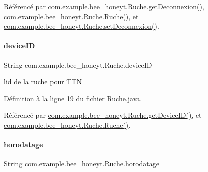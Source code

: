 Référencé par \hyperlink{_ruche_8java_source_l00115}{com.\+example.\+bee\+\_\+honeyt.\+Ruche.\+get\+Deconnexion()}, \hyperlink{_ruche_8java_source_l00044}{com.\+example.\+bee\+\_\+honeyt.\+Ruche.\+Ruche()}, et \hyperlink{_ruche_8java_source_l00117}{com.\+example.\+bee\+\_\+honeyt.\+Ruche.\+set\+Deconnexion()}.

\mbox{\label{classcom_1_1example_1_1bee__honeyt_1_1_ruche_a7126c2ff9e0b3b5365e042c5309ad775}} 
\paragraph{\texorpdfstring{device\+ID}{deviceID}}
{\footnotesize\ttfamily String com.\+example.\+bee\+\_\+honeyt.\+Ruche.\+device\+ID\hspace{0.3cm}{\ttfamily [private]}}



l\textquotesingle{}id de la ruche pour T\+TN 



Définition à la ligne \hyperlink{_ruche_8java_source_l00019}{19} du fichier \hyperlink{_ruche_8java_source}{Ruche.\+java}.



Référencé par \hyperlink{_ruche_8java_source_l00099}{com.\+example.\+bee\+\_\+honeyt.\+Ruche.\+get\+Device\+I\+D()}, et \hyperlink{_ruche_8java_source_l00038}{com.\+example.\+bee\+\_\+honeyt.\+Ruche.\+Ruche()}.

\mbox{\label{classcom_1_1example_1_1bee__honeyt_1_1_ruche_a93b3665d844cbba761ebf9a19a1d7d34}} 
\paragraph{\texorpdfstring{horodatage}{horodatage}}
{\footnotesize\ttfamily String com.\+example.\+bee\+\_\+honeyt.\+Ruche.\+horodatage\hspace{0.3cm}{\ttfamily [private]}}



